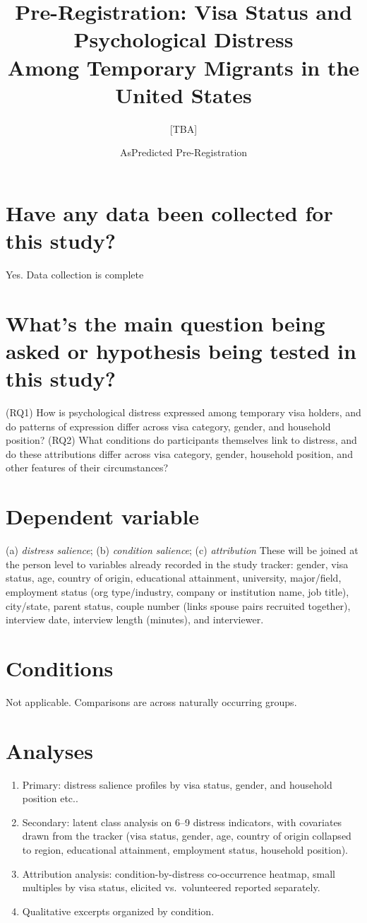 \documentclass[12pt]{article}
\title{\textbf{Pre-Registration: Visa Status and Psychological Distress\\ Among Temporary Migrants in the United States}}
\author{[TBA]}
\date{AsPredicted Pre-Registration}
\begin{document}
\maketitle

\section{Have any data been collected for this study?}

Yes. Data collection is complete
\section{What's the main question being asked or hypothesis being tested in this study?}

(RQ1) How is psychological distress expressed among temporary visa holders, and do patterns of expression differ
across visa category, gender, and household position? (RQ2) What conditions do participants themselves link to
distress, and do these attributions differ across visa category, gender, household position, and other features of
their circumstances?

\section{Dependent variable}

 (a) \emph{distress salience}; (b) \emph{condition salience}; (c) \emph{attribution} These will be joined at the person level to variables
already recorded in the study tracker: gender, visa status, age, country of origin, educational attainment, university,
major/field, employment status (org type/industry, company or institution name, job title), city/state, parent status,
couple number (links spouse pairs recruited together), interview date, interview length (minutes), and interviewer.

\section{Conditions}

Not applicable. Comparisons are across naturally occurring groups.

\section{Analyses}

\begin{enumerate}[label=(\arabic*), leftmargin=1.6em]
\item Primary: distress salience profiles by visa status, gender, and household position etc..
\item Secondary: latent class analysis on 6--9 distress indicators, with covariates drawn from the tracker (visa
status, gender, age, country of origin collapsed to region, educational attainment, employment status, household
position).
\item Attribution analysis: condition-by-distress co-occurrence heatmap, small multiples by visa status, elicited vs.\
volunteered reported separately.
\item Qualitative excerpts organized by condition.
\end{enumerate}
\end{document}
